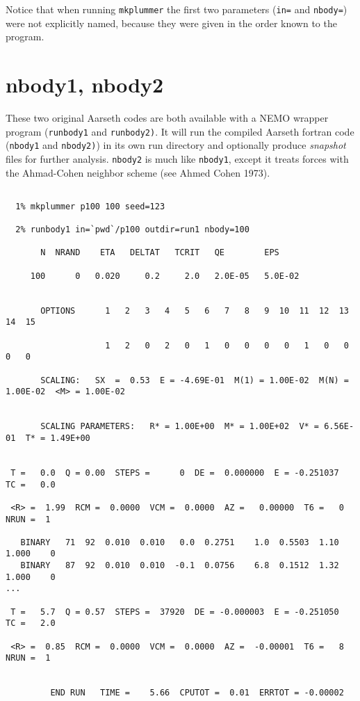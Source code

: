 Notice that when running {\tt mkplummer} the first two parameters ({\tt in=} and {\tt nbody=})
were not explicitly named, because they were given in the order known to the program.


\section{nbody1, nbody2}

These two original Aarseth codes are both available with a NEMO wrapper program
({\tt runbody1} and {\tt runbody2)}. It will run the compiled Aarseth fortran 
code ({\tt nbody1} and {\tt nbody2)})
in its own run directory and 
optionally produce {\it snapshot} files for further
analysis. {\tt nbody2}  is much like {\tt nbody1}, except it
treats forces with the Ahmad-Cohen neighbor scheme (see Ahmed Cohen 1973).

\footnotesize\begin{verbatim}

  1% mkplummer p100 100 seed=123

  2% runbody1 in=`pwd`/p100 outdir=run1 nbody=100

       N  NRAND    ETA   DELTAT   TCRIT   QE        EPS

     100      0   0.020     0.2     2.0   2.0E-05   5.0E-02
 
 
       OPTIONS      1   2   3   4   5   6   7   8   9  10  11  12  13  14  15

                    1   2   0   2   0   1   0   0   0   0   1   0   0   0   0
 
       SCALING:   SX  =  0.53  E = -4.69E-01  M(1) = 1.00E-02  M(N) = 1.00E-02  <M> = 1.00E-02
 

       SCALING PARAMETERS:   R* = 1.00E+00  M* = 1.00E+02  V* = 6.56E-01  T* = 1.49E+00
 
 
 T =   0.0  Q = 0.00  STEPS =      0  DE =  0.000000  E = -0.251037  TC =   0.0
 
 <R> =  1.99  RCM =  0.0000  VCM =  0.0000  AZ =   0.00000  T6 =   0  NRUN =  1
 
   BINARY   71  92  0.010  0.010   0.0  0.2751    1.0  0.5503  1.10  1.000    0
   BINARY   87  92  0.010  0.010  -0.1  0.0756    6.8  0.1512  1.32  1.000    0
...
 
 T =   5.7  Q = 0.57  STEPS =  37920  DE = -0.000003  E = -0.251050  TC =   2.0
 
 <R> =  0.85  RCM =  0.0000  VCM =  0.0000  AZ =  -0.00001  T6 =   8  NRUN =  1
 
 
         END RUN   TIME =    5.66  CPUTOT =  0.01  ERRTOT = -0.00002

\end{verbatim}\normalsize

